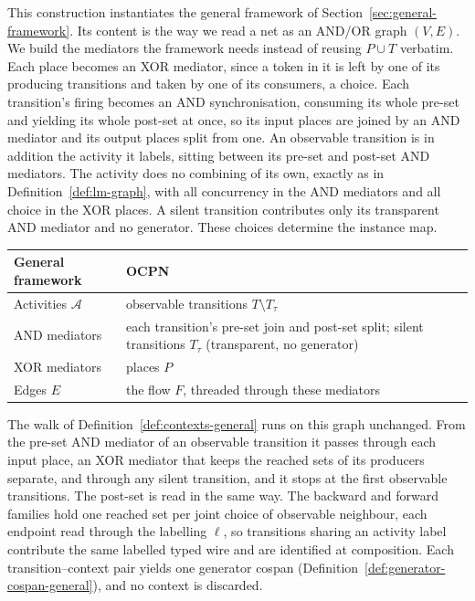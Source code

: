 This construction instantiates the general framework of Section~\ref{sec:general-framework}.
Its content is the way we read a net as an AND/OR graph $(V,E)$. We build the mediators the
framework needs instead of reusing $P\cup T$ verbatim. Each place becomes an XOR mediator, since a
token in it is left by one of its producing transitions and taken by one of its consumers, a
choice. Each transition's firing becomes an AND synchronisation, consuming its whole pre-set and
yielding its whole post-set at once, so its input places are joined by an AND mediator and its
output places split from one. An observable transition is in addition the activity it labels,
sitting between its pre-set and post-set AND mediators. The activity does no combining of its own,
exactly as in Definition~\ref{def:lm-graph}, with all concurrency in the AND mediators
and all choice in the XOR places. A silent transition contributes only its transparent AND mediator
and no generator. These choices determine the instance map.
\medskip
\begin{center}
  \small\begin{tabularx}{\linewidth}{@{}lX@{}}
    \hline
    General framework & OCPN \\
    \hline
    Activities $\mathcal{A}$ & observable transitions $T\setminus T_\tau$ \\
    AND mediators & each transition's pre-set join and post-set split; silent transitions $T_\tau$ (transparent, no generator) \\
    XOR mediators & places $P$ \\
    Edges $E$ & the flow $F$, threaded through these mediators \\
    \hline
  \end{tabularx}
\end{center}
\medskip
The walk of Definition~\ref{def:contexts-general} runs on this graph unchanged. From the pre-set
AND mediator of an observable transition it passes through each input place, an XOR mediator that
keeps the reached sets of its producers separate, and through any silent transition, and it stops
at the first observable transitions. The post-set is read in the same way. The backward and
forward families hold one reached set per joint choice of observable neighbour, each endpoint read
through the labelling $\ell$, so transitions sharing an activity label contribute the same labelled
typed wire and are identified at composition. Each transition--context pair yields one generator
cospan (Definition~\ref{def:generator-cospan-general}), and no context is discarded.

